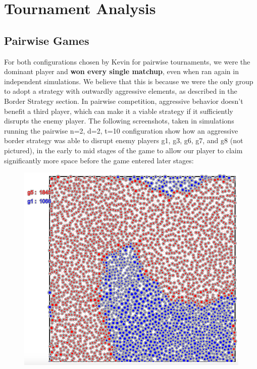 \section{Tournament Analysis}

\subsection{Pairwise Games}
For both configurations chosen by Kevin for pairwise tournaments, we were the dominant player and \textbf{won every single matchup}, even when ran again in independent simulations. We believe that this is because we were the only group to adopt a strategy with outwardly aggressive elements, as described in the Border Strategy section. In pairwise competition, aggressive behavior doesn’t benefit a third player, which can make it a viable strategy if it sufficiently disrupts the enemy player. The following screenshots, taken in simulations running the pairwise n=2, d=2, t=10 configuration show how an aggressive border strategy was able to disrupt enemy players g1, g3, g6, g7, and g8 (not pictured), in the early to mid stages of the game to allow our player to claim significantly more space before the game entered later stages:\\
\begin{figure}[h]
\center
\includegraphics[scale=0.3]{tourn1.png}
\caption{}
\label{fig:tourn1}
\end{figure}

